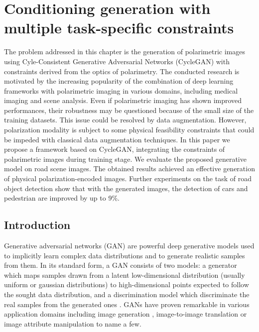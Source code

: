 \chapter{Conditioning generation with multiple task-specific constraints}
\label{chap:chapter3}


\begin{chapterabstract}
	The problem addressed in this chapter is the generation of polarimetric images using Cyle-Consistent Generative Adversarial Networks (CycleGAN) with constraints derived from the optics of polarimetry. The conducted research is motivated by the increasing popularity of the combination of deep learning frameworks with polarimetric imaging in various domains, including medical imaging and scene analysis. Even if polarimetric imaging has shown improved performances, their robustness may be questioned because of the small size of the training datasets. 
	This issue could be resolved by data augmentation. However, polarization modality is subject to some physical feasibility constraints that could be impeded with classical data augmentation techniques. In this paper we propose a framework based on CycleGAN, integrating the constraints of polarimetric images during training stage. We evaluate the proposed generative model on road scene images. 
	The obtained results achieved an effective generation of physical polarization-encoded images. Further experiments on the task of road object detection show that with the generated images, the detection of cars and pedestrian are improved by up to 9\%.
\end{chapterabstract}

\section{Introduction}


Generative  adversarial networks (GAN) \citep{Goodfellow2014,Wang2019} are powerful deep generative models used to  implicitly learn complex data distributions and to generate realistic samples from them. In its standard form, a GAN consists of two models: a generator which maps samples drawn from a latent low-dimensional distribution (usually uniform or gaussian distributions) to  high-dimensional points expected to follow the sought data distribution, and a discrimination model which discriminate the real samples from the generated ones \citep{Goodfellow2014}.  GANs have proven remarkable in various application domains including  image generation \citep{Arjovsky17}, image-to-image translation \citep{Isola2016, Zhu2017, Hoffman18} or image attribute manipulation \citep{Antipov2017} to name a few. 

